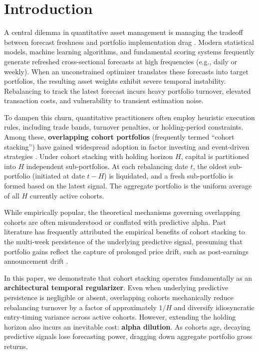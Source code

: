 \documentclass[11pt,a4paper]{article}
\theoremstyle{definition}
\begin{document}
\newpage

\section{Introduction}
\label{sec:introduction}

A central dilemma in quantitative asset management is managing the tradeoff between forecast freshness and portfolio implementation drag \citep{markowitz1952portfolio, garleanu2013dynamic}. Modern statistical models, machine learning algorithms, and fundamental scoring systems frequently generate refreshed cross-sectional forecasts at high frequencies (e.g., daily or weekly). When an unconstrained optimizer translates these forecasts into target portfolios, the resulting asset weights exhibit severe temporal instability. Rebalancing to track the latest forecast incurs heavy portfolio turnover, elevated transaction costs, and vulnerability to transient estimation noise.

To dampen this churn, quantitative practitioners often employ heuristic execution rules, including trade bands, turnover penalties, or holding-period constraints. Among these, \textbf{overlapping cohort portfolios} (frequently termed ``cohort stacking'') have gained widespread adoption in factor investing and event-driven strategies \citep{jegadeesh1993returns, moskowitz2012time, novymarx2012momentum}. Under cohort stacking with holding horizon $H$, capital is partitioned into $H$ independent sub-portfolios. At each rebalancing date $t$, the oldest sub-portfolio (initiated at date $t-H$) is liquidated, and a fresh sub-portfolio is formed based on the latest signal. The aggregate portfolio is the uniform average of all $H$ currently active cohorts.

While empirically popular, the theoretical mechanisms governing overlapping cohorts are often misunderstood or conflated with predictive alpha. Past literature has frequently attributed the empirical benefits of cohort stacking to the multi-week persistence of the underlying predictive signal, presuming that portfolio gains reflect the capture of prolonged price drift, such as post-earnings announcement drift \citep{bernard1989post}.

In this paper, we demonstrate that cohort stacking operates fundamentally as an \textbf{architectural temporal regularizer}. Even when underlying predictive persistence is negligible or absent, overlapping cohorts mechanically reduce rebalancing turnover by a factor of approximately $1/H$ and diversify idiosyncratic entry-timing variance across active cohorts. However, extending the holding horizon also incurs an inevitable cost: \textbf{alpha dilution}. As cohorts age, decaying predictive signals lose forecasting power, dragging down aggregate portfolio gross returns.
\end{document}
